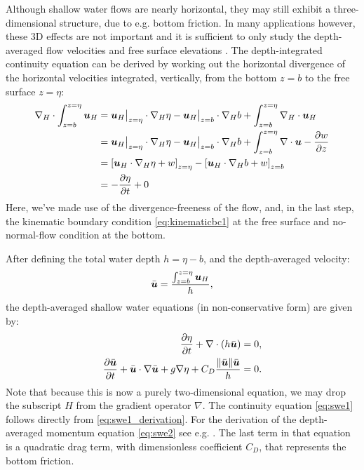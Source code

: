 Although shallow water flows are nearly horizontal, they may still exhibit a
three-dimensional structure, due to e.g. bottom friction. In many applications
however, these 3D effects are not important and it is sufficient to only study
the depth-averaged flow velocities and free surface elevations
\citep{vreugdenhil1994}. The depth-integrated continuity equation can be derived
by working out the horizontal divergence of the horizontal velocities
integrated, vertically, from the bottom $z=b$ to the free surface $z=\eta$:
\begin{equation}
\begin{split}
  \nabla_H \cdot \int_{z=b}^{z=\eta} {\mbox{\boldmath$u$}}_H &=
  {\mbox{\boldmath$u$}}_H\big|_{z=\eta}\cdot\nabla_H \eta
  -{\mbox{\boldmath$u$}}_H\big|_{z=b}\cdot\nabla_H b + \int_{z=b}^{z=\eta} \nabla_H\cdot{\mbox{\boldmath$u$}}_H \\
  &=
  {\mbox{\boldmath$u$}}_H\big|_{z=\eta}\cdot\nabla_H \eta
  -{\mbox{\boldmath$u$}}_H\big|_{z=b}\cdot\nabla_H b 
  + \int_{z=b}^{z=\eta} \nabla\cdot{\mbox{\boldmath$u$}}-\frac{\partial w}{\partial z} \\
  &=
  \left[{\mbox{\boldmath$u$}}_H\cdot\nabla_H \eta + w\right]_{z=\eta}
  -\left[{\mbox{\boldmath$u$}}_H\cdot\nabla_H b + w\right]_{z=b} \\
  &=-\frac{\partial\eta}{\partial t} + 0
  \label{eq:swe1_derivation}
\end{split}
\end{equation}
Here, we've made use of the divergence-freeness of the flow, and, in the last
step, the kinematic boundary condition \eqref{eq:kinematicbc1} at the free
surface and no-normal-flow condition at the bottom.

After defining the total water depth $h=\eta-b$, and the depth-averaged
velocity:
\begin{equation}
  \bar{{\mbox{\boldmath$u$}}} = \frac{\int_{z=b}^{z=\eta} {\mbox{\boldmath$u$}}_H}{h},
\end{equation}
the depth-averaged shallow water equations (in non-conservative form) are given
by:
\begin{subequations} \label{eq:swe}
\begin{align}
  \frac{\partial\eta}{\partial t} + \nabla\cdot\left(h\bar{{\mbox{\boldmath$u$}}}\right) &=0,
  \label{eq:swe1} \\
  \frac{\partial\bar{{\mbox{\boldmath$u$}}}}{\partial t} + \bar{{\mbox{\boldmath$u$}}}\cdot\nabla\bar{{\mbox{\boldmath$u$}}}
  + g\nabla\eta + C_D \frac{\|\bar{{\mbox{\boldmath$u$}}}\|\bar{{\mbox{\boldmath$u$}}}}{h} &=0. \label{eq:swe2}
\end{align}
\end{subequations}
Note that because this is now a purely two-dimensional equation, we may drop the
subscript $H$ from the gradient operator $\nabla$. The continuity equation
\eqref{eq:swe1} follows directly from \eqref{eq:swe1_derivation}.
For the derivation of the depth-averaged momentum equation \eqref{eq:swe2} see
e.g. \citet{vreugdenhil1994}. The last term in that equation is a quadratic drag term, with
dimensionless coefficient $C_D$, that represents the bottom friction.

